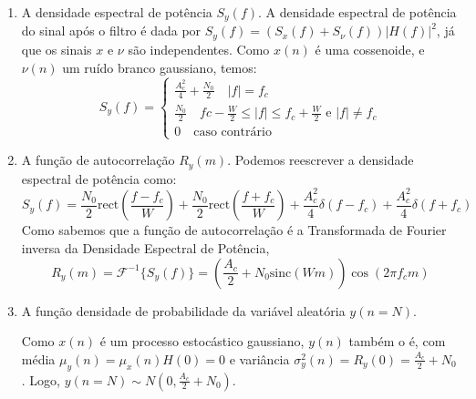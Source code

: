 \begin{enumerate}[label={\bf \alph*:},series=exerc,align=left]
    \item A densidade espectral de potência $S_y(f)$.
    A densidade espectral de potência do sinal após o filtro é dada por $S_y(f) = (S_x(f)+S_\nu(f))|H(f)|^2$, já que os sinais $x$ e $\nu$ são independentes.
    Como $x(n)$ é uma cossenoide, e $\nu(n)$ um ruído branco gaussiano, temos:
    \begin{equation*}
        S_y(f) = \begin{cases}
                      \frac{A_c^2}{4} + \frac{N_0}{2} \quad |f| = f_c \\
                      \frac{N_0}{2} \quad fc-\frac{W}{2} \leq |f| \leq f_c+\frac{W}{2} \text{ e } |f| \neq f_c \\
                      0 \quad \text{caso contrário}
                  \end{cases}
    \end{equation*}
    \item A função de autocorrelação $R_y(m)$.
    Podemos reescrever a densidade espectral de potência como:
    \begin{equation*}
        S_y(f) =
          \frac{N_0}{2}\mathrm{rect}(\frac{f-f_c}{W}) +
          \frac{N_0}{2}\mathrm{rect}(\frac{f+f_c}{W}) +
          \frac{A_c^2}{4}\delta(f-f_c) +
          \frac{A_c^2}{4}\delta(f+f_c)
    \end{equation*}
    Como sabemos que a função de autocorrelação é a Transformada de Fourier inversa da Densidade Espectral de Potência,
    \begin{equation*}
        R_y(m) = \mathcal{F}^{-1}\{S_y(f)\} = (\frac{A_c}{2}+N_0\mathrm{sinc}(Wm))\cos(2 \pi f_c m)
    \end{equation*}
    \item A função densidade de probabilidade da variável aleatória $y(n = N)$.

    Como $x(n)$ é um processo estocástico gaussiano, $y(n)$ também o é, com média $\mu_y(n) = \mu_x(n)H(0) = 0$ e variância $\sigma^2_y(n) = R_y(0) = \frac{A_c}{2} + N_0$.
    Logo, $y(n=N) \sim N(0, \frac{A_c}{2} + N_0)$.
\end{enumerate}
